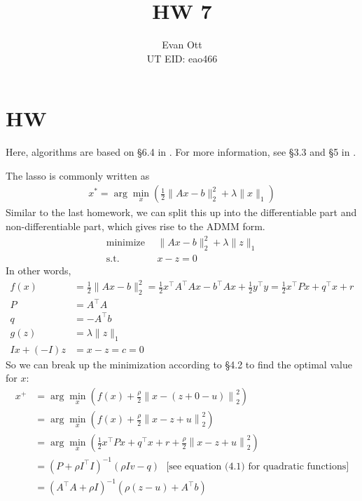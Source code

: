 \documentclass{article}
\title{\vspace{-6ex}HW 7\vspace{-2ex}}
\author{Evan Ott \\ UT EID: eao466\vspace{-2ex}}
\begin{document}
\maketitle

\section{HW}




Here, algorithms are based on \S6.4 in \citep{boyd2011distributed}. For more information, see \S3.3 and \S5 in \citep{boyd2004convex}.



The lasso is commonly written as
\begin{align*}
x^*=\arg\min_x\left(\frac{1}{2}\lVert Ax-b\rVert_2^2 + \lambda \lVert x\rVert_1\right)
\end{align*}
Similar to the last homework, we can split this up into the differentiable part and non-differentiable part, which
gives rise to the ADMM form.
\begin{align*}
\textrm{minimize}~~ &\lVert Ax-b\rVert_2^2 + \lambda \lVert z\rVert_1\\
\textrm{s.t.}~~&x-z=0
\end{align*}
In other words, 
\begin{align*}
f(x)&=\frac{1}{2}\lVert Ax-b\rVert_2^2 = \frac{1}{2}x^\top A^\top A x - b^\top Ax+\frac{1}{2}y^\top y=\frac{1}{2}x^\top Px+q^\top x+r\\
P&=A^\top A\\
q&=-A^\top b\\
g(z)&=\lambda \lVert z\rVert_1\\
Ix + (-I)z &= x-z = c = 0
\end{align*}
So we can break up the minimization according to \S4.2 to find the optimal value for $x$:
\begin{align*}
x^+&=\arg\min_x \left( f(x) + \frac{\rho}{2}\left\lVert x-(z+0-u) \right\rVert_2^2 \right)\\
&=\arg\min_x \left( f(x) + \frac{\rho}{2}\left\lVert x - z + u \right\rVert_2^2 \right)\\
&=\arg\min_x \left( \frac{1}{2}x^\top Px+q^\top x+r + \frac{\rho}{2}\left\lVert x - z + u \right\rVert_2^2 \right)\\
&=\left(P + \rho I^\top I\right)^{-1}\left(\rho I v-q\right)~~~\textrm{[see equation (4.1) for quadratic functions]}\\
&=\left( A^\top A+ \rho I\right)^{-1}\left(\rho  (z - u)+A^\top b\right)
\end{align*}
\end{document}
